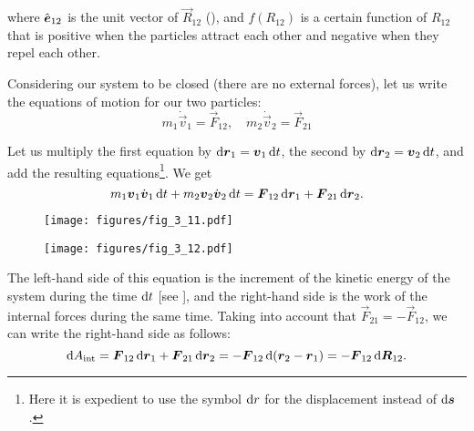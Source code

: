 \noindent
where $\hat{\boldsymbol{e}}_{12}$ is the unit vector of $\vec{R}_{12}$ (), and $f(R_{12})$ is a certain function of $R_{12}$ that is positive when the particles attract each other and negative when they repel each other.

Considering our system to be closed (there are no external forces), let us write the equations of motion for our two particles:
\begin{equation*}
m_1\dot{\vec{v}}_1 = \vec{F}_{12},\quad m_2\dot{\vec{v}}_2 = \vec{F}_{21}
\end{equation*}

\noindent
Let us multiply the first equation by $\mathrm{d}\boldsymbol{r}_1=\boldsymbol{v}_1\,\mathrm{d} t$, the second by $\mathrm{d}\boldsymbol{r}_2=\boldsymbol{v}_2\,\mathrm{d} t$, and add the resulting equations\footnote{Here it is expedient to use the symbol $\mathrm{d} r$ for the displacement instead of $\mathrm{d}\boldsymbol{s}$.}. We get
\begin{equation}\label{eq:3_42}
m_1\boldsymbol{v}_1\dot{\boldsymbol{v}}_1\,\mathrm{d} t + m_2\boldsymbol{v}_2\dot{\boldsymbol{v}}_2\,\mathrm{d} t = \boldsymbol{F}_{12}\,\mathrm{d}\boldsymbol{r}_1 + \boldsymbol{F}_{21}\,\mathrm{d}\boldsymbol{r}_2.
\end{equation}

\begin{figure}[t]
	\begin{minipage}[t]{0.5\linewidth}
		\begin{center}
			\texttt{[image: figures/fig\_3\_11.pdf]}
			\caption[]{}
			\label{fig:3_11}
		\end{center}
	\end{minipage}
	\hspace{-0.05cm}
	\begin{minipage}[t]{0.5\linewidth}
		\begin{center}
			\texttt{[image: figures/fig\_3\_12.pdf]}
			\caption[]{}
			\label{fig:3_12}
		\end{center}
	\end{minipage}
\end{figure}

\noindent
The left-hand side of this equation is the increment of the kinetic energy of the system during the time $\mathrm{d} t$ [see ], and the right-hand side is the work of the internal forces during the same time. Taking into account that $\vec{F}_{21}=-\vec{F}_{12}$, we can write the right-hand side as follows:
\begin{equation}\label{eq:3_43}
\mathrm{d} A_{\text{int}} = \boldsymbol{F}_{12}\,\mathrm{d}\boldsymbol{r}_1 + \boldsymbol{F}_{21}\,\mathrm{d}\boldsymbol{r}_2 = -\boldsymbol{F}_{12}\,\mathrm{d}(\boldsymbol{r}_2-\boldsymbol{r}_1) = -\boldsymbol{F}_{12}\,\mathrm{d}\boldsymbol{R}_{12}.
\end{equation}

